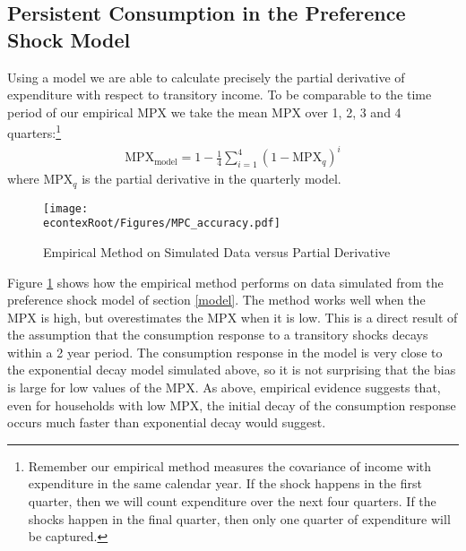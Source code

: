 \documentclass[titlepage]{\econtex}\newcommand{\texname}{ConsumptionHeterogeneity}
\begin{document}
\subsection{Persistent Consumption in the Preference Shock Model}
Using a model we are able to calculate precisely the partial derivative of expenditure with respect to transitory income. To be comparable to the time period of our empirical MPX we take the mean MPX over 1, 2, 3 and 4 quarters:\footnote{Remember our empirical method measures the covariance of income with expenditure in the same calendar year. If the shock happens in the first quarter, then we will count expenditure over the next four quarters. If the shocks happen in the final quarter, then only one quarter of expenditure will be captured.}
\begin{align*}
\text{MPX}_{\text{model}} = 1 - \frac{1}{4}\sum_{i=1}^{4}(1-\text{MPX}_q)^i 
\end{align*}
where $\text{MPX}_q$ is the partial derivative in the quarterly model.
\begin{figure} 
	\begin{centering}
		\texttt{[image: \\econtexRoot/Figures/MPC\_accuracy.pdf]}
		\caption{Empirical Method on Simulated Data versus Partial Derivative}
		\label{fig:MPC_accuracy}
	\end{centering}
\end{figure}

Figure \ref{fig:MPC_accuracy} shows how the empirical method performs on data simulated from the preference shock model of section \ref{model}. The method works well when the MPX is high, but overestimates the MPX when it is low. This is a direct result of the assumption that the consumption response to a transitory shocks decays within a 2 year period. The consumption response in the model is very close to the exponential decay model simulated above, so it is not surprising that the bias is large for low values of the MPX. As above, empirical evidence suggests that, even for households with low MPX, the initial decay of the consumption response occurs much faster than exponential decay would suggest.
\end{document}
